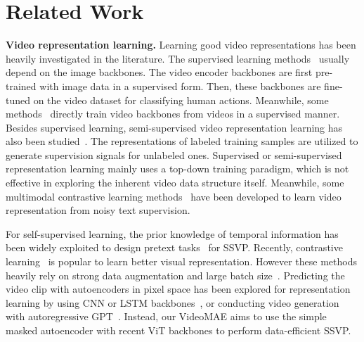 \documentclass{article}
\begin{document}
\section{Related Work}

\par{\noindent \textbf{Video representation learning.}} 
Learning good video representations has been heavily investigated in the literature. The supervised learning methods~\cite{simonyan2014two,tsn_journal,tran2018closer,I3D,timesformer} usually depend on the image backbones.
The video encoder backbones are first pre-trained with image data in a supervised form. Then, these backbones are fine-tuned on the video dataset for classifying human actions. Meanwhile, some methods~\cite{tran2015learning,slowfast,mvit} directly train video backbones from videos in a supervised manner. Besides supervised learning, semi-supervised video representation learning has also been studied~\cite{singh2021semi}. The representations of labeled training samples are utilized to generate supervision signals for unlabeled ones. Supervised or semi-supervised representation learning mainly uses a top-down training paradigm, which is not effective in exploring the inherent video data structure itself. Meanwhile, some multimodal contrastive learning methods~\cite{cpd,MiechASLSZ20,abs-2007-14937} have been developed to learn video representation from noisy text supervision.

For self-supervised learning, the prior knowledge of temporal information has been widely exploited to design pretext tasks~\cite{wang2015unsupervised, misra2016shuffle, vcop, speedNet} for SSVP.
Recently, contrastive learning~\cite{memdpc,pan2021videomoco,han2020coclr,qian2021spatiotemporal,ge2021revitalizing,DBLP:conf/cvpr/0005XZWGHH22} is popular to learn better visual representation. However these methods heavily rely on strong data augmentation and large batch size~\cite{large}. 
Predicting the video clip with autoencoders in pixel space has been explored for representation learning by using CNN or LSTM backbones~\cite{PatrauceanHC15,SrivastavaMS15}, or conducting video generation with autoregressive GPT~\cite{videogpt}. 
Instead, our VideoMAE aims to use the simple masked autoencoder with recent ViT backbones to perform data-efficient SSVP. 
\end{document}

